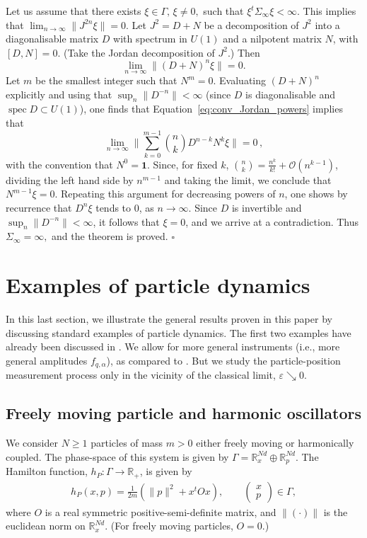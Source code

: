 \documentclass[11pt]{article}
\newcommand{\id}{\mathbf{1}}
\begin{document}
Let us assume that there exists $\xi\in \Gamma,\, \xi \neq0,$ such that $\xi^t\Sigma_\infty\xi<\infty$. 
This implies that $\lim_{n\to\infty} \|J^{2n}\xi\|=0$. Let $J^2=D+N$ be a decomposition of $J^2$ into a 
diagonalisable matrix $D$ with spectrum in $U(1)$ and a nilpotent matrix $N$, with $[D,N]=0$. (Take 
the Jordan decomposition of $J^2$.) Then
	\begin{equation}\label{eq:conv_Jordan_powers}
		\lim_{n\to \infty}\|(D+N)^n\xi\|=0.
	\end{equation}
	Let $m$ be the smallest integer such that $N^m=0$. Evaluating 
	$(D+N)^n$ explicitly and using that $\sup_n\|D^{-n}\|<\infty$ (since $D$ is diagonalisable and 
	$\operatorname{spec}D\subset U(1)$), one finds that
	Equation~\eqref{eq:conv_Jordan_powers} implies that
	\begin{equation}\label{eq:conv_Jordan_powers_developped}
		\lim_{n\to \infty}\|\sum_{k=0}^{m-1}\binom{n}{k}D^{n-k} N^k\xi\|=0\,,
	\end{equation}
	with the convention that $N^0=\id$. Since, for fixed $k$, $\binom{n}{k}=\frac{n^k}{k!}+\mathcal O(n^{k-1})$, dividing the left hand side by $n^{m-1}$ and taking the limit, we conclude that $N^{m-1}\xi=0$. Repeating this argument for decreasing powers of $n$, one shows by recurrence that $D^n \xi$ tends to 0, as $n\rightarrow \infty$. Since $D$ is invertible and 
	$\sup_n\|D^{-n}\|<\infty$, it follows that $\xi=0$, and we arrive at a contradiction. Thus
	$\Sigma_\infty=\infty,$
	and the theorem is proved.  \hfill{$\square$}

\section{Examples of particle dynamics}
In this last section, we illustrate the general results proven in this paper by discussing standard 
examples of particle dynamics. 
The first two examples have already been discussed in \cite{BBFF}. We allow for 
more general instruments (i.e., more general amplitudes $f_{q, \alpha}$), as compared to \cite{BBFF}. But we study the particle-position measurement process 
only in the vicinity of the classical limit, $\varepsilon \searrow 0$. 
\subsection{Freely moving particle and harmonic oscillators}
We consider $N\geq 1$ particles of mass $m>0$ either freely moving or harmonically coupled. 
The phase-space of this system is given by $\Gamma=\mathbb R_x^{Nd}\oplus \mathbb R_p^{Nd}$. The Hamilton function,
$h_P: \Gamma \to\mathbb R_+$, is given by
\begin{align*}
h_P(x,p) = \frac{1}{2m} (\|p\|^2+x^tOx), \qquad \begin{pmatrix} x\\ p \end{pmatrix}\in \Gamma,
\end{align*}
where $O$ is a real symmetric positive-semi-definite matrix, and $\|(\cdot)\|$ is the euclidean norm on
$\mathbb{R}_{x}^{Nd}$. (For freely moving particles, $O=0$.)
\end{document}
